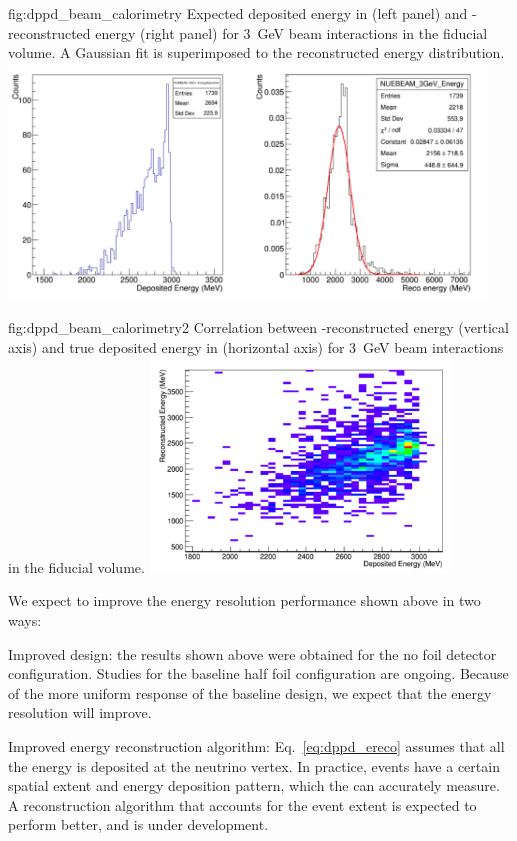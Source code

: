 \begin{dunefigure}{fig:dppd_beam_calorimetry}
{Expected deposited energy in \lar (left panel) and -reconstructed energy (right panel) for \SI{3}{\GeV} beam \nue {} interactions in the \lar fiducial volume. A Gaussian fit is superimposed to the reconstructed energy distribution.}
\includegraphics[width=0.95\textwidth]{graphics/dppd_beam_calorimetry.pdf} 
\end{dunefigure}

\begin{dunefigure}{fig:dppd_beam_calorimetry2}
{Correlation between -reconstructed energy (vertical axis) and true deposited energy in \lar (horizontal axis) for \SI{3}{\GeV} beam \nue {} interactions in the \lar fiducial volume.}
\includegraphics[width=0.60\textwidth]{graphics/dppd_beam_calorimetry2.pdf} 
\end{dunefigure}

We expect to improve the energy resolution performance shown above in two ways:
\begin{description}
   \item Improved  design: the results shown above were obtained for the no  foil detector configuration. Studies for the baseline half foil configuration are ongoing. Because of the more uniform response of the baseline design, we expect that the energy resolution will improve.  
   \item Improved energy reconstruction algorithm: Eq.~\ref{eq:dppd_ereco} assumes that all the energy is deposited at the neutrino vertex. In practice, events have a certain spatial extent and energy deposition pattern, which the  can accurately measure. A reconstruction algorithm that accounts for the event extent is expected to perform better, and is under development.
\end{description}
 